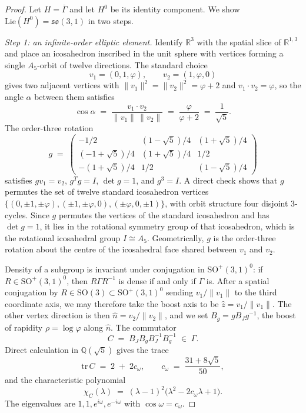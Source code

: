 \documentclass[11pt]{article}
\theoremstyle{remark}
\begin{document}
\begin{proof}
Let $H = \overline{\Gamma}$ and let $H^0$ be its identity component.
We show $\mathrm{Lie}(H^0) = \mathfrak{so}(3,1)$ in two steps.

\emph{Step 1: an infinite-order elliptic element.}
Identify $\mathbb{R}^3$ with the spatial slice of $\mathbb{R}^{1,3}$
and place an icosahedron inscribed in the unit sphere with vertices
forming a single $A_5$-orbit of twelve directions. The standard
choice
\[
  v_1 = (0, 1, \varphi), \qquad v_2 = (1, \varphi, 0)
\]
gives two adjacent vertices with $\|v_1\|^2 = \|v_2\|^2 = \varphi+2$
and $v_1 \cdot v_2 = \varphi$, so the angle $\alpha$ between them
satisfies
\[
  \cos\alpha \;=\; \frac{v_1 \cdot v_2}{\|v_1\|\,\|v_2\|} \;=\;
  \frac{\varphi}{\varphi+2} \;=\; \frac{1}{\sqrt{5}}.
\]
The order-three rotation
\[
  g \;=\; \begin{pmatrix}
    -1/2 & (1-\sqrt{5})/4 & (1+\sqrt{5})/4 \\
    (-1+\sqrt{5})/4 & (1+\sqrt{5})/4 & 1/2 \\
    -(1+\sqrt{5})/4 & 1/2 & (1-\sqrt{5})/4
  \end{pmatrix}
\]
satisfies $g v_1 = v_2$, $g^T g = I$, $\det g = 1$, and $g^3 = I$.
A direct check shows that $g$ permutes the set of twelve standard
icosahedron vertices $\{(0, \pm 1, \pm\varphi), (\pm 1, \pm\varphi, 0),
(\pm\varphi, 0, \pm 1)\}$, with orbit structure four disjoint
$3$-cycles. Since $g$ permutes the vertices of the standard
icosahedron and has $\det g = 1$, it lies in the rotational symmetry
group of that icosahedron, which is the rotational icosahedral group
$I \cong A_5$. Geometrically, $g$ is the order-three rotation about
the centre of the icosahedral face shared between $v_1$ and $v_2$.

Density of a subgroup is invariant under conjugation in
$\mathrm{SO}^+(3,1)^0$: if $R \in \mathrm{SO}^+(3,1)^0$, then
$R \Gamma R^{-1}$ is dense if and only if $\Gamma$ is. After a
spatial conjugation by $R \in \mathrm{SO}(3) \subset
\mathrm{SO}^+(3,1)^0$ sending $v_1 / \|v_1\|$ to the third coordinate
axis, we may therefore take the boost axis to be
$\hat{z} = v_1 / \|v_1\|$. The other vertex direction is then
$\hat{n} = v_2 / \|v_2\|$, and we set $B_g = g B_J g^{-1}$, the boost
of rapidity $\rho = \log\varphi$ along $\hat{n}$. The commutator
\[
  C \;=\; B_J B_g B_J^{-1} B_g^{-1} \;\in\; \Gamma.
\]
Direct calculation in $\mathbb{Q}(\sqrt{5})$ gives the trace
\[
  \mathrm{tr}\,C \;=\; 2 \;+\; 2 c_\omega, \qquad
  c_\omega \;=\; \frac{31 + 8\sqrt{5}}{50},
\]
and the characteristic polynomial
\[
  \chi_C(\lambda) \;=\; (\lambda - 1)^2 \bigl(\lambda^2 - 2 c_\omega
  \lambda + 1\bigr).
\]
The eigenvalues are $1, 1, e^{i\omega}, e^{-i\omega}$ with
$\cos\omega = c_\omega$.


\end{proof}
\end{document}

